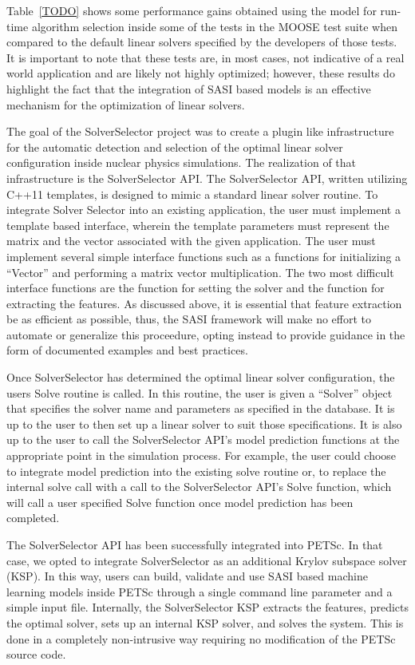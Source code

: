 Table~\ref{TODO} shows some performance gains obtained using the model for run-time algorithm selection inside some of the tests in the MOOSE test suite when compared to the default linear solvers specified by the developers of those tests. It is important to note that these tests are, in most cases, not indicative of a real world application and are likely not highly optimized; however, these results do highlight the fact that the integration of SASI based models is an effective mechanism for the optimization of linear solvers.

The goal of the SolverSelector project was to create a plugin like infrastructure for the automatic detection and selection of the optimal linear solver configuration inside nuclear physics simulations. The realization of that infrastructure is the SolverSelector API. The SolverSelector API, written utilizing C++11 templates, is designed to mimic a standard linear solver routine. To integrate Solver Selector into an existing application, the user must implement a template based interface, wherein the template parameters must represent the matrix and the vector associated with the given application. The user must implement several simple interface functions such as a functions for initializing a ``Vector'' and performing a matrix vector multiplication. The two most difficult interface functions are the function for setting the solver and the function for extracting the features. As discussed above, it is essential that feature extraction be as efficient as possible, thus, the SASI framework will make no effort to automate or generalize this proceedure, opting instead to provide guidance in the form of documented examples and best practices. 

Once SolverSelector has determined the optimal linear solver configuration, the users Solve routine is called. In this routine, the user is given a ``Solver'' object that specifies the solver name and parameters as specified in the database. It is up to the user to then set up a linear solver to suit those specifications. It is also up to the user to call the SolverSelector API's model prediction functions at the appropriate point in the simulation process. For example, the user could choose to integrate model prediction into the existing solve routine or, to replace the internal solve call with a call to the SolverSelector API's Solve function, which will call a user specified Solve function once model prediction has been completed. 

The SolverSelector API has been successfully integrated into PETSc. In that case, we opted to integrate SolverSelector as an additional Krylov subspace solver (KSP). In this way, users can build, validate and use SASI based machine learning models inside PETSc through a single command line parameter and a simple input file. Internally, the SolverSelector KSP extracts the features, predicts the optimal solver, sets up an internal KSP solver, and solves the system. This is done in a completely non-intrusive way requiring no modification of the PETSc source code. 

